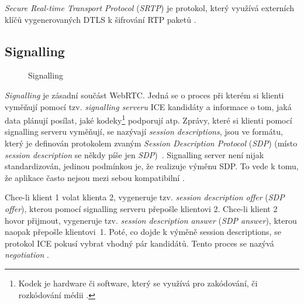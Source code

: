 \textit{Secure Real-time Transport Protocol} (\textit{SRTP}) je protokol, který
využívá externích klíčů vygenerovaných DTLS k šifrování RTP paketů
\cite{WebRTCForTheCurious}.

\subsection{Signalling}\label{signalling}

\begin{figure}[H]
    \centering
    \caption{Signalling}
    \label{signallingServer}
\end{figure}

\textit{Signalling} je zásadní součást WebRTC. Jedná se o proces při kterém si
klienti vyměňují pomocí tzv. \textit{signalling serveru} ICE kandidáty a
informace o tom, jaká data plánují posílat, jaké kodeky\footnote{Kodek je
    hardware či software, který se využívá pro zakódování, či rozkódování médii
    \cite{Britannica-Codec,TechTarget-Codec}.} podporují atp. Zprávy, které si
klienti pomocí signalling serveru vyměňují, se nazývají \textit{session
    descriptions}, jsou ve formátu, který je definován protokolem zvaným
\textit{Session Description Protocol} (\textit{SDP}) (místo \textit{session
    description} se někdy píše jen \textit{SDP})~\cite{WebRTCForTheCurious}.
Signalling server není nijak standardizován, jedinou podmínkou je, že realizuje
výměnu SDP. To vede k tomu, že aplikace často nejsou mezi sebou kompatibilní
\cite{MDN-Web-SignalingAndVideoCalling}.

Chce-li klient 1 volat klienta 2, vygeneruje tzv. \textit{session description
    offer} (\textit{SDP offer}), kterou pomocí signalling serveru přepošle klientovi
2. Chce-li klient 2 hovor přijmout, vygeneruje tzv. \textit{session description
    answer} (\textit{SDP answer}), kterou naopak přepošle klientovi~1. Poté, co
dojde k výměně session descriptions, se protokol ICE pokusí vybrat vhodný pár
kandidátů. Tento proces se nazývá \textit{negotiation}
\cite{WebRTCForTheCurious,MozillaBlog-PerfectNegotiation}.

